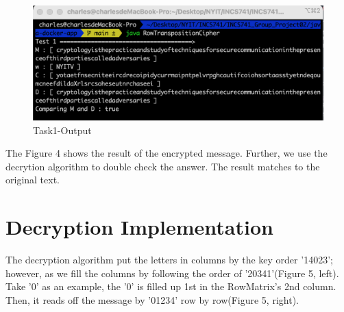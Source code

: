 \documentclass[twoside,twocolumn]{article}
\begin{document}
\begin{figure}[H]
  \centering
  \includegraphics[scale=0.35]{./Graphs/Figure1.6.png}
  \caption{Task1-Output}
  \label{fig:testfig1}
\end{figure}

The Figure 4 shows the result of the encrypted message. Further, we use the decrytion algorithm to double check the answer. The result matches to the original text.\\ 

\vspace*{-0.10cm}
\section{Decryption Implementation}

The decryption algorithm put the letters in columns by the key order '14023'; however, as we fill the columns by following the order of '20341'(Figure 5, left). Take '0' as an example, the '0' is filled up 1st in the RowMatrix's 2nd column. Then, it reads off the message by '01234' row by row(Figure 5, right). \\
\end{document}
